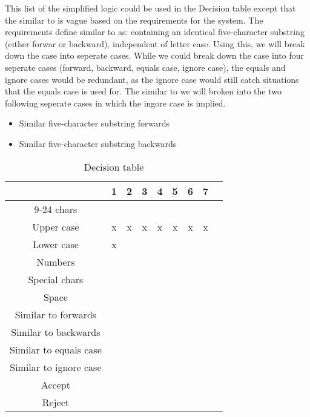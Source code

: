 \documentclass[12pt,letterpaper]{article}
\begin{document}
This list of the simplified logic could be used in the Decision table except that the similar to is vague based on the
requirements for the system. The requirements define similar to as: containing an identical five-character
substring (either forwar or backward), independent of letter case.
Using this, we will break down the case into seperate cases. While we could break down the case into
four seperate cases (forward, backward, equals case, ignore case), the equals and
ignore cases would be redundant, as the ignore case would still catch situations that the equals
case is used for. The similar to we will broken into the two following seperate cases in which the ingore case is implied.
\begin{itemize}
\item Similar five-character substring forwards
\item Similar five-character substring backwards
\end{itemize}

\begin{table}[h]
  \begin{center}
    \caption{Decision table}
    \label{tab:Main table}
    
    \begin{tabular}{c|c|c|c|c|c|c|c|c}
    & 1 & 2 & 3 & 4 & 5 & 6 & 7 & \\
    \hline
    9-24 chars & & & & & & & \\
    \hline
    Upper case & x & x & x & x & x & x & x \\
    \hline
    Lower case & x & & & & & & \\
    \hline
    Numbers & & & & & & & \\
    \hline
    Special chars & & & & & & & \\
    \hline
    Space & & & & & & & \\
    \hline
    Similar to forwards & & & & & & & \\
    \hline
    Similar to backwards & & & & & & & \\
    \hline
    Similar to equals case & & & & & & & \\
    \hline
    Similar to ignore case & & & & & & & \\
    \midrule
    Accept & & & & & & & \\
    \hline
    Reject & & & & & & & \\
    \end{tabular}
  \end{center}
\end{table}
\end{document}
